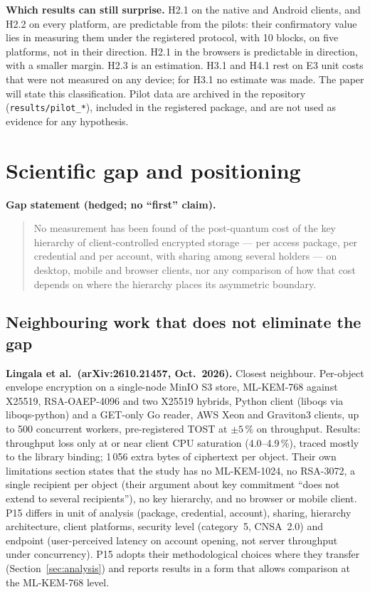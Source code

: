 \documentclass[11pt,a4paper]{article}
\begin{document}
\textbf{Which results can still surprise.} H2.1 on the native and Android clients, and H2.2 on every platform, are predictable from the pilots: their confirmatory value lies in measuring them under the registered protocol, with 10 blocks, on five platforms, not in their direction. H2.1 in the browsers is predictable in direction, with a smaller margin. H2.3 is an estimation. H3.1 and H4.1 rest on E3 unit costs that were not measured on any device; for H3.1 no estimate was made. The paper will state this classification. Pilot data are archived in the repository (\texttt{results/pilot\_*}), included in the registered package, and are not used as evidence for any hypothesis.

\section{Scientific gap and positioning}
\textbf{Gap statement (hedged; no ``first'' claim).}
\begin{quote}
No measurement has been found of the post-quantum cost of the key hierarchy of client-controlled encrypted storage --- per access package, per credential and per account, with sharing among several holders --- on desktop, mobile and browser clients, nor any comparison of how that cost depends on where the hierarchy places its asymmetric boundary.
\end{quote}

\subsection{Neighbouring work that does not eliminate the gap}
\textbf{Lingala et al.\ (arXiv:2610.21457, Oct.\ 2026).} Closest neighbour. Per-object envelope encryption on a single-node MinIO S3 store, ML-KEM-768 against X25519, RSA-OAEP-4096 and two X25519 hybrids, Python client (liboqs via liboqs-python) and a GET-only Go reader, AWS Xeon and Graviton3 clients, up to 500 concurrent workers, pre-registered TOST at $\pm5\,\%$ on throughput. Results: throughput loss only at or near client CPU saturation (4.0--4.9\,\%), traced mostly to the library binding; 1\,056 extra bytes of ciphertext per object. Their own limitations section states that the study has no ML-KEM-1024, no RSA-3072, a single recipient per object (their argument about key commitment ``does not extend to several recipients''), no key hierarchy, and no browser or mobile client. P15 differs in unit of analysis (package, credential, account), sharing, hierarchy architecture, client platforms, security level (category~5, CNSA~2.0) and endpoint (user-perceived latency on account opening, not server throughput under concurrency). P15 adopts their methodological choices where they transfer (Section~\ref{sec:analysis}) and reports results in a form that allows comparison at the ML-KEM-768 level.
\end{document}
